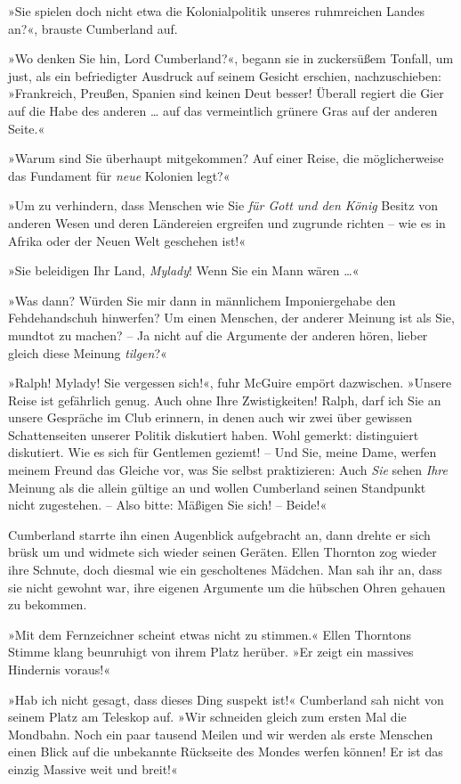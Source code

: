 »Sie spielen doch nicht etwa die Kolonialpolitik unseres
ruhmreichen Landes an?«, brauste Cumberland auf.

»Wo denken Sie hin, Lord Cumberland?«, begann sie in zuckersüßem
Tonfall, um just, als ein befriedigter Ausdruck auf seinem Gesicht
erschien, nachzuschieben: »Frankreich, Preußen, Spanien sind keinen
Deut besser! Überall regiert die Gier auf die Habe des anderen …
auf das vermeintlich grünere Gras auf der anderen Seite.«

»Warum sind Sie überhaupt mitgekommen? Auf einer Reise, die
möglicherweise das Fundament für \emph{neue} Kolonien legt?«

»Um zu verhindern, dass Menschen wie Sie
\emph{für Gott und den König} Besitz von anderen Wesen und deren
Ländereien ergreifen und zugrunde richten – wie es in Afrika oder
der Neuen Welt geschehen ist!«

»Sie beleidigen Ihr Land, \emph{Mylady}! Wenn Sie ein Mann wären
…«

»Was dann? Würden Sie mir dann in männlichem Imponiergehabe den
Fehdehandschuh hinwerfen? Um einen Menschen, der anderer Meinung
ist als Sie, mundtot zu machen? – Ja nicht auf die Argumente der
anderen hören, lieber gleich diese Meinung \emph{tilgen}?«

»Ralph! Mylady! Sie vergessen sich!«, fuhr McGuire empört
dazwischen. »Unsere Reise ist gefährlich genug. Auch ohne Ihre
Zwistigkeiten! Ralph, darf ich Sie an unsere Gespräche im Club
erinnern, in denen auch wir zwei über gewissen Schattenseiten
unserer Politik diskutiert haben. Wohl gemerkt: distinguiert
diskutiert. Wie es sich für Gentlemen geziemt! – Und Sie, meine
Dame, werfen meinem Freund das Gleiche vor, was Sie selbst
praktizieren: Auch \emph{Sie} sehen \emph{Ihre} Meinung als die
allein gültige an und wollen Cumberland seinen Standpunkt nicht
zugestehen. – Also bitte: Mäßigen Sie sich! – Beide!«

Cumberland starrte ihn einen Augenblick aufgebracht an, dann drehte
er sich brüsk um und widmete sich wieder seinen Geräten. Ellen
Thornton zog wieder ihre Schnute, doch diesmal wie ein gescholtenes
Mädchen. Man sah ihr an, dass sie nicht gewohnt war, ihre eigenen
Argumente um die hübschen Ohren gehauen zu bekommen.

\tb

»Mit dem Fernzeichner scheint etwas nicht zu stimmen.« Ellen
Thorntons Stimme klang beunruhigt von ihrem Platz herüber. »Er
zeigt ein massives Hindernis voraus!«

»Hab ich nicht gesagt, dass dieses Ding suspekt ist!« Cumberland
sah nicht von seinem Platz am Teleskop auf. »Wir schneiden gleich
zum ersten Mal die Mondbahn. Noch ein paar tausend Meilen und wir
werden als erste Menschen einen Blick auf die unbekannte Rückseite
des Mondes werfen können! Er ist das einzig Massive weit und
breit!«

